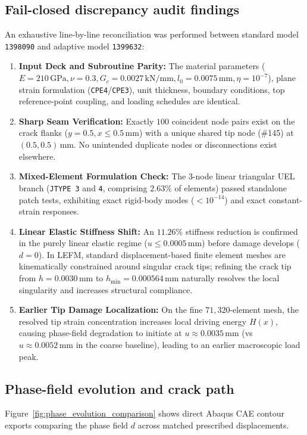 \subsection{Fail-closed discrepancy audit findings}
An exhaustive line-by-line reconciliation was performed between standard model \texttt{1398090} and adaptive model \texttt{1399632}:
\begin{enumerate}
  \item \textbf{Input Deck and Subroutine Parity:} The material parameters ($E=210\,\mathrm{GPa}, \nu=0.3, G_c=0.0027\,\mathrm{kN/mm}, l_0=0.0075\,\mathrm{mm}, \eta=10^{-7}$), plane strain formulation (\texttt{CPE4}/\texttt{CPE3}), unit thickness, boundary conditions, top reference-point coupling, and loading schedules are identical.
  \item \textbf{Sharp Seam Verification:} Exactly $100$ coincident node pairs exist on the crack flanks ($y=0.5, x \le 0.5\,\mathrm{mm}$) with a unique shared tip node (\#145) at $(0.5, 0.5)\,\mathrm{mm}$. No unintended duplicate nodes or disconnections exist elsewhere.
  \item \textbf{Mixed-Element Formulation Check:} The 3-node linear triangular UEL branch (\texttt{JTYPE 3} and \texttt{4}, comprising $2.63\%$ of elements) passed standalone patch tests, exhibiting exact rigid-body modes ($<10^{-14}$) and exact constant-strain responses.
  \item \textbf{Linear Elastic Stiffness Shift:} An $11.26\%$ stiffness reduction is confirmed in the purely linear elastic regime ($u \le 0.0005\,\mathrm{mm}$) before damage develops ($d = 0$). In LEFM, standard displacement-based finite element meshes are kinematically constrained around singular crack tips; refining the crack tip from $h = 0.0030\,\mathrm{mm}$ to $h_{\min} = 0.000564\,\mathrm{mm}$ naturally resolves the local singularity and increases structural compliance.
  \item \textbf{Earlier Tip Damage Localization:} On the fine $71{,}320$-element mesh, the resolved tip strain concentration increases local driving energy $H(x)$, causing phase-field degradation to initiate at $u \approx 0.0035\,\mathrm{mm}$ (vs $u \approx 0.0052\,\mathrm{mm}$ in the coarse baseline), leading to an earlier macroscopic load peak.
\end{enumerate}

\subsection{Phase-field evolution and crack path}
Figure~\ref{fig:phase_evolution_comparison} shows direct Abaqus CAE contour exports comparing the phase field $d$ across matched prescribed displacements.

